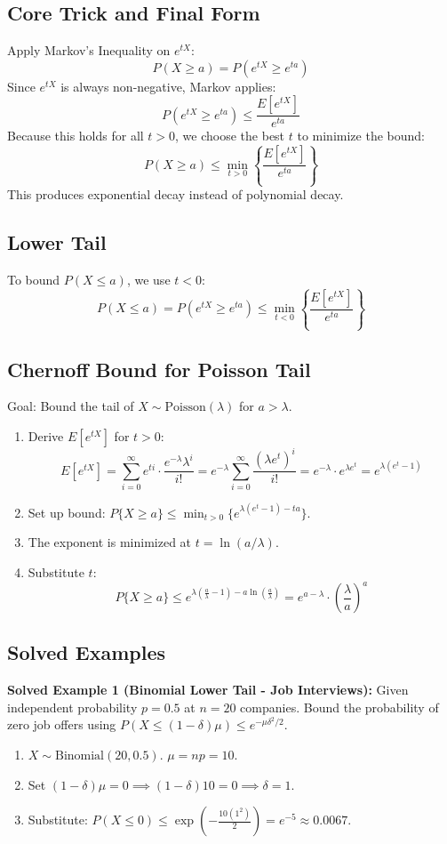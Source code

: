 \documentclass[11pt]{article}
\begin{document}
\subsection{Core Trick and Final Form}
Apply Markov's Inequality on $e^{tX}$:
\[ P(X \ge a) = P(e^{tX} \ge e^{ta}) \]
Since $e^{tX}$ is always non-negative, Markov applies:
\[ P(e^{tX} \ge e^{ta}) \le \frac{E[e^{tX}]}{e^{ta}} \]
Because this holds for all $t > 0$, we choose the best $t$ to minimize the bound:
\[ P(X \ge a) \le \min_{t>0} \left\{ \frac{E[e^{tX}]}{e^{ta}} \right\} \]
This produces exponential decay instead of polynomial decay.

\subsection{Lower Tail}
To bound $P(X \le a)$, we use $t < 0$:
\[ P(X \le a) = P(e^{tX} \ge e^{ta}) \le \min_{t<0} \left\{ \frac{E[e^{tX}]}{e^{ta}} \right\} \]

\subsection{Chernoff Bound for Poisson Tail}
Goal: Bound the tail of $X \sim \text{Poisson}(\lambda)$ for $a > \lambda$.
\begin{enumerate}
    \item Derive $E[e^{tX}]$ for $t > 0$:
    \[ E[e^{tX}] = \sum_{i=0}^{\infty} e^{ti} \cdot \frac{e^{-\lambda}\lambda^i}{i!} = e^{-\lambda}\sum_{i=0}^{\infty} \frac{(\lambda e^t)^i}{i!} = e^{-\lambda} \cdot e^{\lambda e^t} = e^{\lambda(e^t - 1)} \]
    \item Set up bound: $P\{X \ge a\} \le \min_{t>0} \{ e^{\lambda(e^t - 1) - ta} \}$.
    \item The exponent is minimized at $t = \ln(a/\lambda)$.
    \item Substitute $t$:
    \[ P\{X \ge a\} \le e^{\lambda(\frac{a}{\lambda} - 1) - a \ln(\frac{a}{\lambda})} = e^{a - \lambda} \cdot \left(\frac{\lambda}{a}\right)^a \]
\end{enumerate}

\subsection{Solved Examples}
\textbf{Solved Example 1 (Binomial Lower Tail - Job Interviews):}
Given independent probability $p=0.5$ at $n=20$ companies. Bound the probability of zero job offers using $P(X \le (1-\delta)\mu) \le e^{-\mu \delta^2 / 2}$.
\begin{enumerate}
    \item $X \sim \text{Binomial}(20, 0.5)$. $\mu = np = 10$.
    \item Set $(1-\delta)\mu = 0 \implies (1-\delta)10 = 0 \implies \delta = 1$.
    \item Substitute: $P(X \le 0) \le \exp\left(-\frac{10(1^2)}{2}\right) = e^{-5} \approx 0.0067$.
\end{enumerate}
\end{document}

